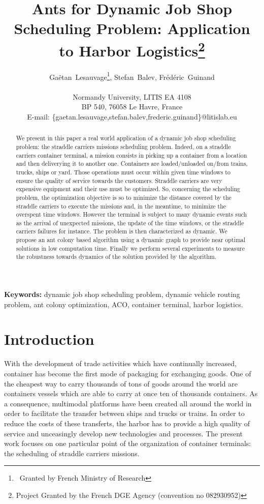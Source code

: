 \documentclass[a4paper,12pt]{article}
\title{Ants for Dynamic Job Shop Scheduling Problem: Application to Harbor Logistics\thanks{Project Granted by the French DGE Agency (convention no 082930952)}
}
\author{Ga\"{e}tan~Lesauvage\thanks{~Granted by French Ministry of Research}, Stefan~Balev, Fr\'{e}d\'{e}ric~Guinand\\\\
\medskip
Normandy University, LITIS EA 4108\\
BP 540, 76058 Le Havre, France\\
\medskip
E-mail: \{gaetan.lesauvage,stefan.balev,frederic.guinand\}@litislab.eu\\
}
\begin{document}
\maketitle

\begin{abstract}
We present in this paper a real world application of a dynamic job shop scheduling problem: the straddle carriers missions scheduling problem. Indeed, on a straddle carriers container terminal, a mission consists in picking up a container from a location and then deliverying it to another one. Containers are loaded/unloaded on/from trains, trucks, ships or yard. Those operations must occur within given time windows to ensure the quality of service towards the customers. Straddle carriers are very expensive equipment and their use must be optimized. So, concerning the scheduling problem, the optimization objective is so to minimize the distance covered by the straddle carriers to execute the missions and, in the meantime, to minimize the overspent time windows.
However the terminal is subject to many dynamic events such as the arrival of unexpected missions, the update of the time windows, or the straddle carriers failures for instance. The problem is then characterized as dynamic.
We propose an ant colony based algorithm using a dynamic graph to provide near optimal solutions in low computation time.
Finally we perform several experiments to measure the robustness towards dynamics of the solution provided by the algorithm.
\end{abstract}

{\bf Keywords: } dynamic job shop scheduling problem, dynamic vehicle routing problem, ant colony optimization, ACO, container terminal, harbor logistics.\\

\section{Introduction}

With the development of trade activities which have continually increased, container has become the first mode of packaging for exchanging goods. One of the cheapest way to carry thousands of tons of goods around the world are containers vessels which are able to carry at once ten of thousands containers. As a consequence, multimodal platforms have been created all around the world in order to facilitate the transfer between ships and trucks or trains. In order to reduce the costs of these transferts, the harbor has to provide a high quality of service and unceasingly develop new technologies and processes. The present work focuses on one particular point of the organization of container terminals: the scheduling of straddle carriers missions.\\
\end{document}
